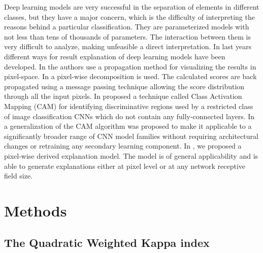 \documentclass[review]{elsarticle}
\theoremstyle{definition} %
\theoremstyle{remark}
\begin{document}
Deep learning models are very successful in the separation of elements in different classes, but they have a major concern, which is the difficulty of interpreting the reasons behind a particular classification. They are parameterized models with not less than tens of thousands of parameters. The interaction between them is very difficult to analyze, making unfeasible a direct interpretation. In last years different ways for result explanation of deep learning models have been developed. In \cite{zeiler2014visualizing} the authors use a propagation method for visualizing the results in pixel-space. In \cite{bach2015pixel} a pixel-wise decomposition is used. The calculated scores are back propagated using a message passing technique allowing the score distribution through all the input pixels. In \cite{zhou2016learning} proposed a technique called Class Activation Mapping (CAM) for identifying discriminative regions used by a restricted class of image classification CNNs which do not contain any fully-connected layers. In \cite{selvaraju2017grad} a generalization of the CAM algorithm was proposed to make it applicable to a significantly broader range of CNN model families without requiring architectural changes or retraining any secondary learning component. In \cite{de2017deep}, we proposed a pixel-wise derived explanation model. The model is of general applicability and is able to generate explanations either at pixel level or at any network receptive field size.


\section{Methods}\label{sec:methods}


\subsection{The Quadratic Weighted Kappa index}
\end{document}
